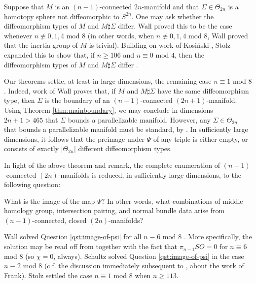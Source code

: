 \begin{rmk} \label{rmk:inertia}
Suppose that $M$ is an $(n-1)$-connected $2n$-manifold and that $\Sigma \in \Theta_{2n}$ is a homotopy sphere not diffeomorphic to $S^{2n}$.  One may ask whether the diffeomorphism types of $M$ and $M \sharp \Sigma$ differ.  Wall proved this to be the case whenever $n \not \equiv 0,1,4$ mod $8$ \cite[p.289]{Wall67} (in other words, when $n \not \equiv 0,1,4$ mod $8$, Wall proved that the inertia group of $M$ is trivial).
Building on work of Kosi\'{n}ski \cite{Kosinski}, Stolz expanded this to show  that, if $n \ge 106$ and $n \equiv 0$ mod $4$, then the diffeomorphism types of $M$ and $M \sharp \Sigma$ differ \cite[Theorem D]{StolzBook}.

Our theorems settle, at least in large dimensions, the remaining case $n \equiv 1$ mod $8$.
Indeed, work of Wall \cite[Theorem 10]{Wall67} proves that, if $M$ and $M \sharp \Sigma$ have the same diffeomorphism type, then $\Sigma$ is the boundary of an $(n-1)$-connected $(2n+1)$-manifold.
Using Theorem \ref{thm:mainboundary}, we may conclude in dimensions $2n+1 > 465$ that $\Sigma$ bounds a parallelizable manifold.
However, any $\Sigma \in \Theta_{2n}$ that bounds a parallelizable manifold must be standard, by \cite[Theorem 5.1]{KervaireMilnor}. In sufficiently large dimensions, it follows that the preimage under $\Psi$ of any triple is either empty, or consists of exactly $|\Theta_{2n}|$ different diffeomorphism types.
\end{rmk}

In light of the above theorem and remark, the complete enumeration of $(n-1)$-connected $(2n)$-manifolds is reduced, in sufficiently large dimensions, to the following question:

\begin{qst} \label{qst:image-of-psi}
What is the image of the map $\Psi$?  In other words, what combinations of middle homology group, intersection pairing, and normal bundle data arise from $(n-1)$-connected, closed $(2n)$-manifolds?
\end{qst}

\begin{rmk}
Wall solved Question \ref{qst:image-of-psi} for all $n \equiv 6$ mod $8$ \cite[Case 4]{Wall62}. More specifically, the solution may be read off from \cite[Proposition 5]{Wall62} together with the fact that $\pi_{n-1} SO =0$ for $n \equiv 6$ mod $8$ (so $\chi=0$, always).  Schultz \cite[Corollary 3.2]{Schultz} solved Question \ref{qst:image-of-psi} in the case $n \equiv 2$ mod $8$ (c.f. the discussion immediately subsequent to  \cite[Corollary 3.2]{Schultz}, about the work of Frank). Stolz \cite[Theorems B \& C]{StolzBook} settled the case $n \equiv 1$ mod $8$ when $n \ge 113$.
\end{rmk}

